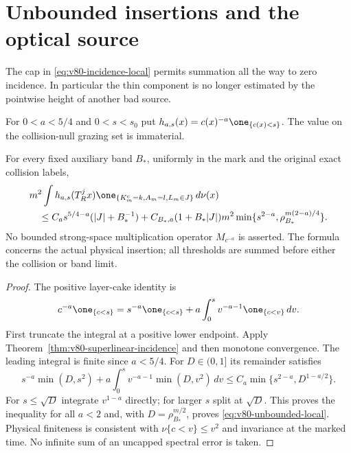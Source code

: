 \section{Unbounded insertions and the optical source}
\label{sec:v80-singular-optical}
The cap in \eqref{eq:v80-incidence-local} permits summation all the
way to zero incidence. In particular the thin component is no longer
estimated by the pointwise height of another bad source.

For $0<a<5/4$ and $0<s<s_0$ put
$h_{a,s}(x)=c(x)^{-a}\one_{\{c(x)<s\}}$. The value on the
collision-null grazing set is immaterial.

\begin{theorem}
\label{thm:v80-unbounded-insertion}
For every fixed auxiliary band $B_*$, uniformly in the mark and the
original exact collision labels,
\begin{align}
 &m^2\int h_{a,s}(T_R^jx)
           \one_{\{K_m^{\rm c}=k,A_m=l,L_m\in J\}}\,d\nu(x)
                                                        \notag\\
 &\quad\le C_a s^{5/4-a}(|J|+B_*^{-1})
  +C_{B_*,a}(1+B_*|J|)m^2
       \min\{s^{2-a},\rho_{B_*}^{m(2-a)/4}\}.          \label{eq:v80-unbounded-local}
\end{align}
No bounded strong-space multiplication operator $M_{c^{-a}}$ is
asserted. The formula concerns the actual physical insertion; all
thresholds are summed before either the collision or band limit.
\end{theorem}
\begin{proof}
The positive layer-cake identity is
\[
 c^{-a}\one_{\{c<s\}}
  =s^{-a}\one_{\{c<s\}}
      +a\int_0^s v^{-a-1}\one_{\{c<v\}}\,dv.
\]
First truncate the integral at a positive lower endpoint. Apply
Theorem~\ref{thm:v80-superlinear-incidence} and then monotone
convergence. The leading integral is finite since $a<5/4$.
For $D\in(0,1]$ its remainder satisfies
\begin{equation}\label{eq:v80-cap-integral}
 s^{-a}\min(D,s^2)
   +a\int_0^s v^{-a-1}\min(D,v^2)\,dv
       \le C_a\min\{s^{2-a},D^{1-a/2}\}.
\end{equation}
For $s\le\sqrt D$ integrate $v^{1-a}$ directly; for larger $s$
split at $\sqrt D$. This proves the inequality for all $a<2$ and,
with $D=\rho_{B_*}^{m/2}$, proves
\eqref{eq:v80-unbounded-local}. Physical finiteness is consistent
with $\nu\{c<v\}\le v^2$ and invariance at the marked time.
No infinite sum of an uncapped spectral error is taken.
\end{proof}

